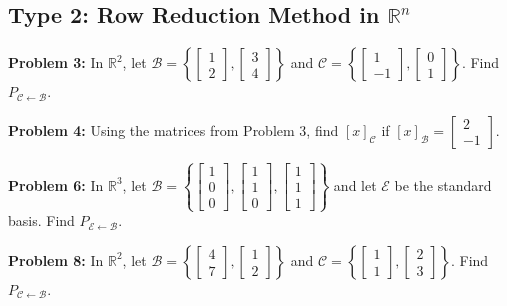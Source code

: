 \documentclass[11pt]{article}
\begin{document}
\subsection*{Type 2: Row Reduction Method in $\mathbb{R}^n$}
\textbf{Problem 3:} In $\mathbb{R}^2$, let $\mathcal{B} = \left\{ \begin{bmatrix} 1 \\ 2 \end{bmatrix}, \begin{bmatrix} 3 \\ 4 \end{bmatrix} \right\}$ and $\mathcal{C} = \left\{ \begin{bmatrix} 1 \\ -1 \end{bmatrix}, \begin{bmatrix} 0 \\ 1 \end{bmatrix} \right\}$. Find $P_{\mathcal{C} \leftarrow \mathcal{B}}$.

\vspace{0.5cm}
\textbf{Problem 4:} Using the matrices from Problem 3, find $[x]_{\mathcal{C}}$ if $[x]_{\mathcal{B}} = \begin{bmatrix} 2 \\ -1 \end{bmatrix}$.

\vspace{0.5cm}
\textbf{Problem 6:} In $\mathbb{R}^3$, let $\mathcal{B} = \left\{ \begin{bmatrix} 1 \\ 0 \\ 0 \end{bmatrix}, \begin{bmatrix} 1 \\ 1 \\ 0 \end{bmatrix}, \begin{bmatrix} 1 \\ 1 \\ 1 \end{bmatrix} \right\}$ and let $\mathcal{E}$ be the standard basis. Find $P_{\mathcal{E} \leftarrow \mathcal{B}}$.

\vspace{0.5cm}
\textbf{Problem 8:} In $\mathbb{R}^2$, let $\mathcal{B} = \left\{ \begin{bmatrix} 4 \\ 7 \end{bmatrix}, \begin{bmatrix} 1 \\ 2 \end{bmatrix} \right\}$ and $\mathcal{C} = \left\{ \begin{bmatrix} 1 \\ 1 \end{bmatrix}, \begin{bmatrix} 2 \\ 3 \end{bmatrix} \right\}$. Find $P_{\mathcal{C} \leftarrow \mathcal{B}}$.
\end{document}
